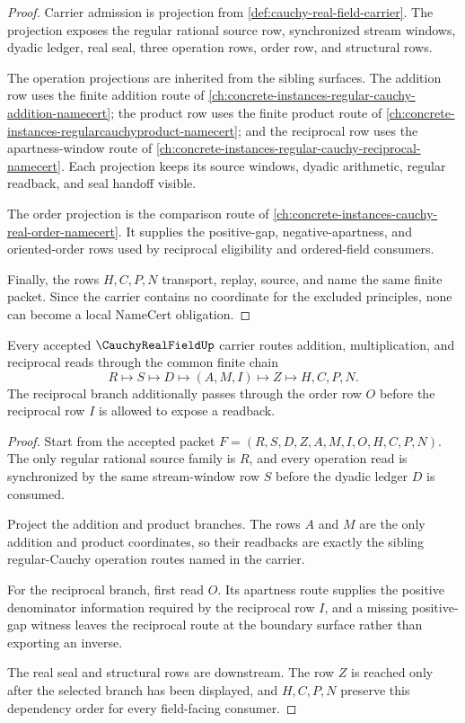 \begin{proof}
Carrier admission is projection from \autoref{def:cauchy-real-field-carrier}. The projection exposes the regular rational source row, synchronized stream windows, dyadic ledger, real seal, three operation rows, order row, and structural rows.

The operation projections are inherited from the sibling surfaces. The addition row uses the finite addition route of \autoref{ch:concrete-instances-regular-cauchy-addition-namecert}; the product row uses the finite product route of \autoref{ch:concrete-instances-regularcauchyproduct-namecert}; and the reciprocal row uses the apartness-window route of \autoref{ch:concrete-instances-regular-cauchy-reciprocal-namecert}. Each projection keeps its source windows, dyadic arithmetic, regular readback, and seal handoff visible.

The order projection is the comparison route of \autoref{ch:concrete-instances-cauchy-real-order-namecert}. It supplies the positive-gap, negative-apartness, and oriented-order rows used by reciprocal eligibility and ordered-field consumers.

Finally, the rows $H,C,P,N$ transport, replay, source, and name the same finite packet. Since the carrier contains no coordinate for the excluded principles, none can become a local NameCert obligation.
\end{proof}

\begin{theorem}
\label{thm:cauchy-real-field-operation-composition}
Every accepted $\CauchyRealFieldUp$ carrier routes addition, multiplication, and reciprocal reads through the common finite chain
$$
R\longmapsto S\longmapsto D\longmapsto (A,M,I)\longmapsto Z\longmapsto H,C,P,N .
$$
The reciprocal branch additionally passes through the order row $O$ before the reciprocal row $I$ is allowed to expose a readback.
\end{theorem}
\begin{proof}
Start from the accepted packet $F=(R,S,D,Z,A,M,I,O,H,C,P,N)$. The only regular rational source family is $R$, and every operation read is synchronized by the same stream-window row $S$ before the dyadic ledger $D$ is consumed.

Project the addition and product branches. The rows $A$ and $M$ are the only addition and product coordinates, so their readbacks are exactly the sibling regular-Cauchy operation routes named in the carrier.

For the reciprocal branch, first read $O$. Its apartness route supplies the positive denominator information required by the reciprocal row $I$, and a missing positive-gap witness leaves the reciprocal route at the boundary surface rather than exporting an inverse.

The real seal and structural rows are downstream. The row $Z$ is reached only after the selected branch has been displayed, and $H,C,P,N$ preserve this dependency order for every field-facing consumer.
\end{proof}

